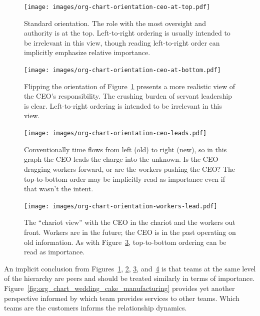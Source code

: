 \begin{figure}
\begin{center}
\texttt{[image: images/org-chart-orientation-ceo-at-top.pdf]}
\end{center}
\caption{Standard orientation. The role with the most oversight and authority is at the top. Left-to-right ordering is usually intended to be irrelevant in this view, though reading left-to-right  order can implicitly emphasize relative importance.}
\label{fig:org_chart_orientation_ceo-at-top}
\end{figure}

\begin{figure}
\begin{center}
\texttt{[image: images/org-chart-orientation-ceo-at-bottom.pdf]}
\end{center}
\caption{Flipping the orientation of Figure~\ref{fig:org_chart_orientation_ceo-at-top} presents a more realistic view of the CEO's responsibility. The crushing burden of servant leadership is clear. Left-to-right ordering is intended to be irrelevant in this view.}
\label{fig:org_chart_orientation_ceo-at-bottom}
\end{figure}

\begin{figure}
\begin{center}
\texttt{[image: images/org-chart-orientation-ceo-leads.pdf]}
\end{center}
\caption{Conventionally time flows from left (old) to right (new), so in this graph the CEO leads the charge into the unknown. Is the CEO dragging workers forward, or are the workers pushing the CEO? The top-to-bottom order may be implicitly read as importance even if that wasn't the intent. }
\label{fig:org_chart_orientation_ceo-leads}
\end{figure}

\begin{figure}
\begin{center}
\texttt{[image: images/org-chart-orientation-workers-lead.pdf]}
\end{center}
\caption{The ``chariot view'' with the CEO in the chariot and the workers out front. Workers are in the future; the CEO is in the past operating on old information. As with Figure~\ref{fig:org_chart_orientation_ceo-leads}, top-to-bottom ordering can be read as importance. }
\label{fig:org_chart_orientation_ceo-follows}
\end{figure}

An implicit conclusion from Figures~\ref{fig:org_chart_orientation_ceo-at-top}, \ref{fig:org_chart_orientation_ceo-at-bottom}, \ref{fig:org_chart_orientation_ceo-leads}, and~\ref{fig:org_chart_orientation_ceo-follows} is that teams at the same level of the hierarchy are peers and should be treated similarly in terms of importance. Figure~\ref{fig:org_chart_wedding_cake_manufacturing} provides yet another perspective informed by which team provides services to other teams. Which teams are the customers informs the relationship dynamics.

